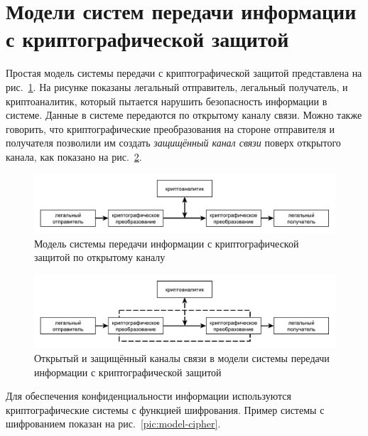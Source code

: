 \section[Модели систем передачи информации]{Модели систем передачи информации с криптографической защитой}

Простая модель системы передачи с криптографической защитой представлена на рис.~\ref{pic:model-simple}. На рисунке показаны легальный отправитель, легальный получатель, и криптоаналитик, который пытается нарушить безопасность информации в системе. Данные в системе передаются по открытому каналу связи. Можно также говорить, что криптографические преобразования на стороне отправителя и получателя позволили им создать \emph{защищённый канал связи} поверх открытого канала, как показано на рис.~\ref{pic:model-simple-with-channel}.

\begin{figure}[!thb]
	\centering
	\includegraphics[width=1.0\textwidth]{pic/model-simple}
	\caption{Модель системы передачи информации с криптографической защитой по открытому каналу\label{pic:model-simple}}
\end{figure}

\begin{figure}[!thb]
	\centering
	\includegraphics[width=1.0\textwidth]{pic/model-simple-with-channel}
	\caption{Открытый и защищённый каналы связи в модели системы передачи информации с криптографической защитой\label{pic:model-simple-with-channel}}
\end{figure}

Для обеспечения конфиденциальности информации используются криптографические системы с функцией шифрования. Пример системы с шифрованием показан на рис.~\ref{pic:model-cipher}.

